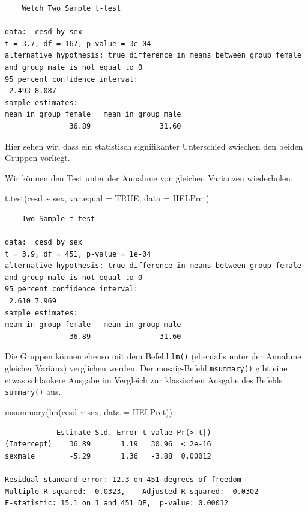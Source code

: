 \documentclass[
  ngerman,
]{scrbook}
\newenvironment{Shaded}{\begin{snugshade}}{\end{snugshade}}
\newcommand{\AttributeTok}[1]{\textcolor[rgb]{0.77,0.63,0.00}{#1}}
\newcommand{\ConstantTok}[1]{\textcolor[rgb]{0.00,0.00,0.00}{#1}}
\newcommand{\FunctionTok}[1]{\textcolor[rgb]{0.00,0.00,0.00}{#1}}
\newcommand{\NormalTok}[1]{#1}
\newcommand{\SpecialCharTok}[1]{\textcolor[rgb]{0.00,0.00,0.00}{#1}}
\begin{document}
\begin{verbatim}
    Welch Two Sample t-test

data:  cesd by sex
t = 3.7, df = 167, p-value = 3e-04
alternative hypothesis: true difference in means between group female and group male is not equal to 0
95 percent confidence interval:
 2.493 8.087
sample estimates:
mean in group female   mean in group male 
               36.89                31.60 
\end{verbatim}

Hier sehen wir, dass ein statistisch signifikanter Unterschied zwischen den beiden Gruppen vorliegt.

Wir können den Test unter der Annahme von gleichen Varianzen wiederholen:

\begin{Shaded}
\begin{Highlighting}[]
\FunctionTok{t.test}\NormalTok{(cesd }\SpecialCharTok{\textasciitilde{}}\NormalTok{ sex, }\AttributeTok{var.equal =} \ConstantTok{TRUE}\NormalTok{, }\AttributeTok{data =}\NormalTok{ HELPrct)}
\end{Highlighting}
\end{Shaded}

\begin{verbatim}
    Two Sample t-test

data:  cesd by sex
t = 3.9, df = 451, p-value = 1e-04
alternative hypothesis: true difference in means between group female and group male is not equal to 0
95 percent confidence interval:
 2.610 7.969
sample estimates:
mean in group female   mean in group male 
               36.89                31.60 
\end{verbatim}

Die Gruppen können ebenso mit dem Befehl \texttt{lm()} (ebenfalls unter der Annahme gleicher Varianz) verglichen werden. Der \textsf{mosaic}-Befehl \texttt{msummary()} gibt eine etwas schlankere Ausgabe im Vergleich zur klassischen Ausgabe des Befehls \texttt{summary()} aus.

\begin{Shaded}
\begin{Highlighting}[]
\FunctionTok{msummary}\NormalTok{(}\FunctionTok{lm}\NormalTok{(cesd }\SpecialCharTok{\textasciitilde{}}\NormalTok{ sex, }\AttributeTok{data =}\NormalTok{ HELPrct))}
\end{Highlighting}
\end{Shaded}

\begin{verbatim}
            Estimate Std. Error t value Pr(>|t|)
(Intercept)    36.89       1.19   30.96  < 2e-16
sexmale        -5.29       1.36   -3.88  0.00012

Residual standard error: 12.3 on 451 degrees of freedom
Multiple R-squared:  0.0323,    Adjusted R-squared:  0.0302 
F-statistic: 15.1 on 1 and 451 DF,  p-value: 0.00012
\end{verbatim}
\end{document}
